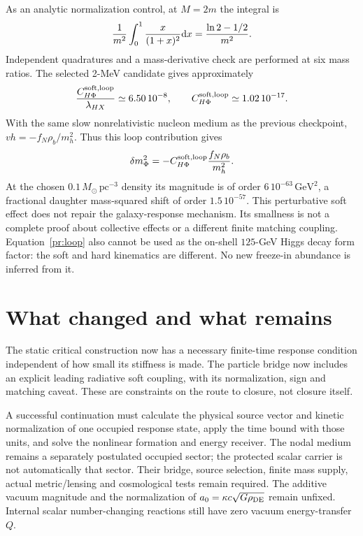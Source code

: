 \documentclass[11pt]{article}
\newcommand{\dd}{\mathrm d}
\begin{document}
As an analytic normalization control, at $M=2m$ the integral is
\begin{equation}
 {1\over m^2}\int_0^1{x\over(1+x)^2}\dd x
 ={\ln2-1/2\over m^2}.
\end{equation}
Independent quadratures and a mass-derivative check are performed at six
mass ratios. The selected 2-MeV candidate gives approximately
\begin{equation}
 {C_{H\Phi}^{\rm soft,loop}\over\lambda_{HX}}
 \simeq6.50\,10^{-8},\qquad
 C_{H\Phi}^{\rm soft,loop}\simeq1.02\,10^{-17}.
\end{equation}
With the same slow nonrelativistic nucleon medium as the previous
checkpoint, $vh=-f_N\rho_b/m_h^2$. Thus this loop contribution gives
\begin{equation}
 \delta m_\Phi^2=-C_{H\Phi}^{\rm soft,loop}{f_N\rho_b\over m_h^2}.
\end{equation}
At the chosen $0.1\,M_\odot\,\mathrm{pc}^{-3}$ density its magnitude is
of order $6\,10^{-63}\,\mathrm{GeV}^2$, a fractional daughter
mass-squared shift of order $1.5\,10^{-57}$. This perturbative soft
effect does not repair the galaxy-response mechanism. Its smallness is
not a complete proof about collective effects or a different finite
matching coupling. Equation~\eqref{pr:loop} also cannot be used as the
on-shell $125$-GeV Higgs decay form factor: the soft and hard kinematics
are different. No new freeze-in abundance is inferred from it.

\section{What changed and what remains}
The static critical construction now has a necessary finite-time response
condition independent of how small its stiffness is made. The particle
bridge now includes an explicit leading radiative soft coupling, with its
normalization, sign and matching caveat. These are constraints on the
route to closure, not closure itself.

A successful continuation must calculate the physical source vector and
kinetic normalization of one occupied response state, apply the time bound
with those units, and solve the nonlinear formation and energy receiver.
The nodal medium remains a separately postulated occupied sector; the
protected scalar carrier is not automatically that sector. Their bridge,
source selection, finite mass supply, actual metric/lensing and cosmological
tests remain required. The additive vacuum magnitude and the normalization
of $a_0=\kappa c\sqrt{G\rho_{\rm DE}}$ remain unfixed. Internal scalar
number-changing reactions still have zero vacuum energy-transfer $Q$.
\end{document}
